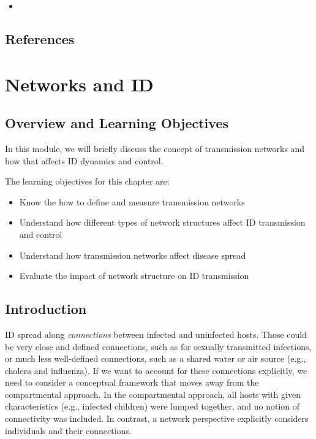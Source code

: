 \documentclass[]{book}
\providecommand{\tightlist}{%
  \setlength{\itemsep}{0pt}\setlength{\parskip}{0pt}}
\theoremstyle{definition}
\theoremstyle{definition}
\theoremstyle{definition}
\theoremstyle{remark}
\begin{document}
\begin{itemize}
\item
\end{itemize}

\section{References}\label{references-15}

\chapter{Networks and ID}\label{networks-and-id}

\section{Overview and Learning
Objectives}\label{overview-and-learning-objectives-15}

In this module, we will briefly discuss the concept of transmission
networks and how that affects ID dynamics and control.

The learning objectives for this chapter are:

\begin{itemize}
\tightlist
\item
  Know the how to define and measure transmission networks
\item
  Understand how different types of network structures affect ID
  transmission and control
\item
  Understand how transmission networks affect disease spread
\item
  Evaluate the impact of network structure on ID transmission
\end{itemize}

\section{Introduction}\label{introduction-15}

ID spread along \emph{connections} between infected and uninfected
hosts. Those could be very close and defined connections, such as for
sexually transmitted infections, or much less well-defined connections,
such as a shared water or air source (e.g., cholera and influenza). If
we want to account for these connections explicitly, we need to consider
a conceptual framework that moves away from the compartmental approach.
In the compartmental approach, all hosts with given characteristics
(e.g., infected children) were lumped together, and no notion of
connectivity was included. In contrast, a network perspective explicitly
considers individuals and their connections.
\end{document}
